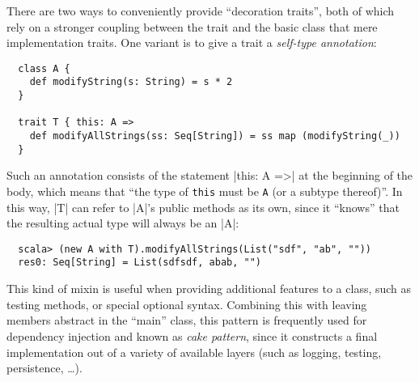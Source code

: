 There are two ways to conveniently provide \enquote{decoration traits}, both of which rely on a
stronger coupling between the trait and the basic class that mere implementation traits. One variant
is to give a trait a \emph{self-type annotation}:
\begin{lstlisting}
  class A {
    def modifyString(s: String) = s * 2
  }

  trait T { this: A => 
    def modifyAllStrings(ss: Seq[String]) = ss map (modifyString(_))
  }
\end{lstlisting}
Such an annotation consists of the statement |this: A =>| at the beginning of the body, which means
that \enquote{the type of \texttt{this} must be \texttt{A} (or a subtype thereof)}. In this way, |T|
can refer to |A|'s public methods as its own, since it \enquote{knows} that the resulting actual
type will always be an |A|:
\begin{lstlisting}
  scala> (new A with T).modifyAllStrings(List("sdf", "ab", ""))
  res0: Seq[String] = List(sdfsdf, abab, "")
\end{lstlisting}
This kind of mixin is useful when providing additional features to a class, such as testing methods,
or special optional syntax. Combining this with leaving members abstract in the \enquote{main}
class, this pattern is frequently used for dependency injection and known as \emph{cake pattern},
since it constructs a final implementation out of a variety of available layers (such as logging,
testing, persistence, \ldots).

